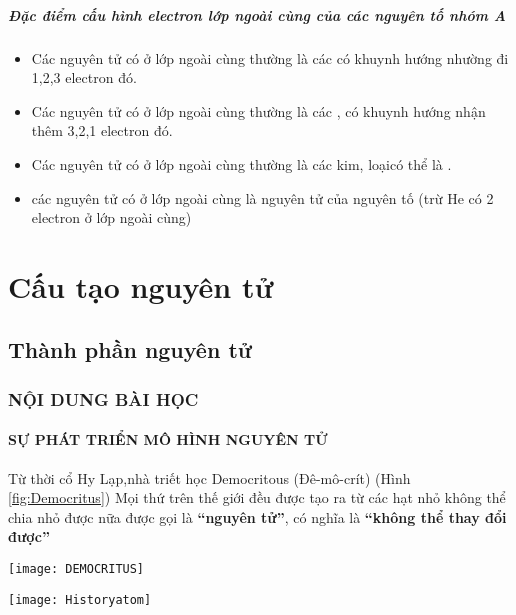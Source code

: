 \paragraph{Đặc điểm cấu hình electron lớp ngoài cùng của các nguyên tố nhóm A}

\begin{hoplythuyet}
	\begin{itemize}
		\item Các nguyên tử có  ở lớp ngoài cùng thường là các  có khuynh hướng nhường đi 1,2,3 electron đó.
		\item Các nguyên tử có  ở lớp ngoài cùng thường là các , có khuynh hướng nhận thêm 3,2,1 electron đó.
		\item Các nguyên tử có   ở lớp ngoài cùng thường là các kim, loạicó thể là .
		\item các nguyên tử có  ở lớp ngoài cùng là nguyên tử của nguyên tố  (trừ He có 2 electron ở lớp ngoài cùng) 
	\end{itemize}
\end{hoplythuyet}
\chapter{Cấu tạo nguyên tử}
\section{Thành phần nguyên tử}
\subsection{NỘI DUNG BÀI HỌC}
\subsubsection{SỰ PHÁT TRIỂN MÔ HÌNH NGUYÊN TỬ}
\begin{hoplythuyet}
\begin{minipage}[htp!]{0.5\textwidth}
Từ thời cổ Hy Lạp,nhà triết học Democritous (Đê-mô-crít) (Hình \ref{fig:Democritus})
Mọi thứ trên thế giới đều được tạo ra từ các hạt nhỏ không thể chia nhỏ được nữa được gọi là \textbf{“nguyên tử”}, có nghĩa là \textbf{“không thể thay đổi được”}
\end{minipage}
\begin{minipage}[htp!]{0.5\textwidth}
\begin{center}
		\texttt{[image: DEMOCRITUS]}
\end{center}
\end{minipage}

\begin{center}
	\texttt{[image: Historyatom]}
\end{center}
\end{hoplythuyet}
